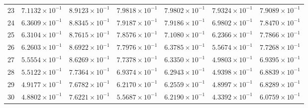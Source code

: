 \begin{table}[H]
\begin{tabular}{@{}rrrrrrr@{}}
23 & $7.1132\times10^{-1}$ & $8.9123\times10^{-1}$ & $7.9818\times10^{-1}$ & $7.9802\times10^{-1}$ & $7.9324\times10^{-1}$ & $7.9089\times10^{-1}$\\
24 & $6.3609\times10^{-1}$ & $8.8345\times10^{-1}$ & $7.9187\times10^{-1}$ & $7.9186\times10^{-1}$ & $6.9802\times10^{-1}$ & $7.8470\times10^{-1}$\\
25 & $6.3104\times10^{-1}$ & $8.7615\times10^{-1}$ & $7.8576\times10^{-1}$ & $7.1080\times10^{-1}$ & $6.2366\times10^{-1}$ & $7.7866\times10^{-1}$\\
26 & $6.2603\times10^{-1}$ & $8.6922\times10^{-1}$ & $7.7976\times10^{-1}$ & $6.3785\times10^{-1}$ & $5.5674\times10^{-1}$ & $7.7268\times10^{-1}$\\
27 & $5.5554\times10^{-1}$ & $8.6269\times10^{-1}$ & $7.7378\times10^{-1}$ & $6.3350\times10^{-1}$ & $4.9803\times10^{-1}$ & $6.9395\times10^{-1}$\\
28 & $5.5122\times10^{-1}$ & $7.7364\times10^{-1}$ & $6.9374\times10^{-1}$ & $6.2943\times10^{-1}$ & $4.9398\times10^{-1}$ & $6.8839\times10^{-1}$\\
29 & $4.9177\times10^{-1}$ & $7.6782\times10^{-1}$ & $6.2170\times10^{-1}$ & $6.2559\times10^{-1}$ & $4.8997\times10^{-1}$ & $6.8289\times10^{-1}$\\
30 & $4.8802\times10^{-1}$ & $7.6221\times10^{-1}$ & $5.5687\times10^{-1}$ & $6.2190\times10^{-1}$ & $4.3392\times10^{-1}$ & $6.0759\times10^{-1}$\\
\bottomrule
\end{tabular}
\end{table}


